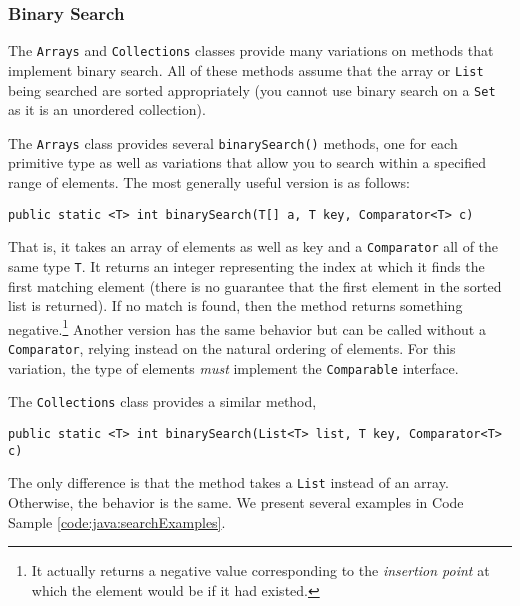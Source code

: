 \subsubsection{Binary Search}

The \texttt{Arrays} and \texttt{Collections} classes
provide many variations on methods that implement binary search.  All
of these methods assume that the array or \texttt{List} being
searched are sorted appropriately (you cannot use binary search on a 
\texttt{Set} as it is an unordered collection).

The \texttt{Arrays} class provides several 
\texttt{binarySearch()} methods, one for each primitive type 
as well as variations that allow you to search within a specified range 
of elements.
The most generally useful version is as follows:

\texttt{public static <T> int binarySearch(T[] a, T key, Comparator<T> c)}

That is, it takes an array of elements as well as key and a 
\texttt{Comparator} all of the same type \texttt{T}.
It returns an integer representing the index at which it finds the first
matching element (there is no guarantee that the first element in the
sorted list is returned).  If no match is found, then the method returns
something negative.\footnote{It actually returns a negative value corresponding
to the \emph{insertion point} at which the element would be if it had
existed.}  Another version has the same behavior but can be called without
a \texttt{Comparator}, relying instead on the natural ordering of
elements.  For this variation, the type of elements \emph{must} implement
the \texttt{Comparable} interface.

The \texttt{Collections} class provides a similar method, 

\texttt{public static <T> int binarySearch(List<T> list, T key, Comparator<T> c)}

The only difference is that the method takes a \texttt{List} instead
of an array.  Otherwise, the behavior is the same.  We present several examples
in Code Sample \ref{code:java:searchExamples}.

